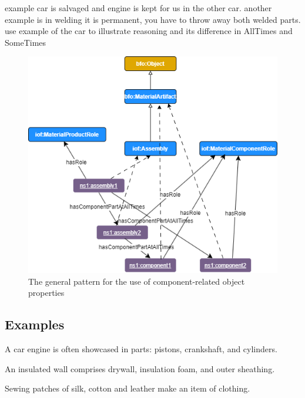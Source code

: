 example car is salvaged and engine is kept for us in the other car. 
another example is in welding it is permanent, you have to throw away both welded parts. 
use example of the car to illustrate reasoning and its difference in AllTimes and SomeTimes

\begin{figure}[h]
\includegraphics[scale=0.5]{scenarios/assemblies-components/images/assembly-components-generic.png}
\caption{The general pattern for the use of component-related object properties} 
\label{gen-pttn-components}
\end{figure}


\subsection*{Examples}

A car engine is often showcased in parts: pistons, crankshaft, and cylinders.

An insulated wall comprises drywall, insulation foam, and outer sheathing.

Sewing patches of silk, cotton and leather make an item of clothing.
